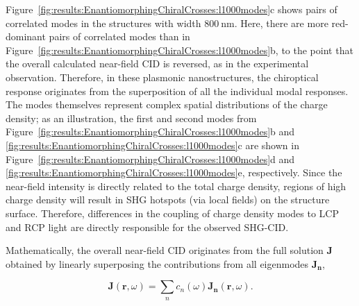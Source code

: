 Figure~\ref{fig:results:EnantiomorphingChiralCrosses:l1000modes}c shows pairs of correlated modes in the structures with width $\SI{800}{\nano\m}$. Here, there are more red-dominant pairs of correlated modes than in Figure~\ref{fig:results:EnantiomorphingChiralCrosses:l1000modes}b, to the point that the overall calculated near-field CID is reversed, as in the experimental observation. Therefore, in these plasmonic nanostructures, the chiroptical response originates from the superposition of all the individual modal responses. 
The modes themselves represent complex spatial distributions of the charge density; as an illustration, the first and second modes from Figure~\ref{fig:results:EnantiomorphingChiralCrosses:l1000modes}b and \ref{fig:results:EnantiomorphingChiralCrosses:l1000modes}c are shown in Figure~\ref{fig:results:EnantiomorphingChiralCrosses:l1000modes}d and \ref{fig:results:EnantiomorphingChiralCrosses:l1000modes}e, respectively.
Since the near-field intensity is directly related to the total charge density, regions of high charge density will result in SHG hotspots (via local fields) on the structure surface. Therefore, differences in the coupling of charge density modes to LCP and RCP light are directly responsible for the observed SHG-CID.

Mathematically, the overall near-field CID originates from the full solution $\mathbf{J}$ obtained by linearly superposing the contributions from all eigenmodes $\mathbf{J_n}$, 

\begin{equation}\label{eq:background:ChiropticalEffects:totalSolution}	
	\mathbf{J} (\mathbf{r}, \omega) = \sum \limits_{n} c_{n}(\omega) \mathbf{J_{n}}(\mathbf{r}, \omega).
\end{equation}

